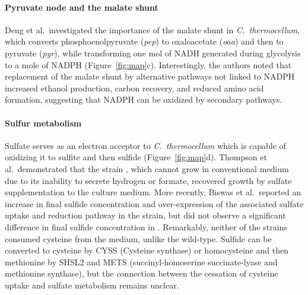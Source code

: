 \paragraph{Pyruvate node and the malate shunt}
Deng et al.\citep{deng2013}\ investigated the importance of the malate shunt in \textit{C.~thermocellum}, which converts phosphoenolpyruvate (\textit{pep}) to oxaloacetate (\textit{oaa}) and then to pyruvate (\textit{pyr}), while transforming one mol of NADH generated during glycolysis to a mole of NADPH (Figure~\ref{fig:map}c). Interestingly, the authors noted that replacement of the malate shunt by alternative pathways not linked to NADPH increased ethanol production, carbon recovery, and reduced amino acid formation, suggesting that NADPH can be oxidized by secondary pathways.

\paragraph{Sulfur metabolism}
Sulfate serves as an electron acceptor to \textit{C.~thermocellum} which is capable of oxidizing it to sulfite and then sulfide (Figure~\ref{fig:map}d).
Thompson et al.\citep{thompson2015}\ demonstrated that the strain , which cannot grow in conventional medium due to its inability to secrete hydrogen or formate, recovered growth by sulfate supplementation to the culture medium.
More recently, Biswas et al.\citep{biswas2017}\ reported an increase in final sulfide concentration and over-expression of the associated sulfate uptake and reduction pathway in the  strain, but did not observe a significant difference in final sulfide concentration in .
Remarkably, neither of the strains consumed cysteine from the medium, unlike the wild-type.
Sulfide can be converted to cysteine by CYSS (Cysteine synthase) or homocysteine and then methionine by SHSL2 and METS (succinyl-homoserine succinate-lyase and methionine synthase), but the connection between the cessation of cysteine uptake and sulfate metabolism remains unclear.


